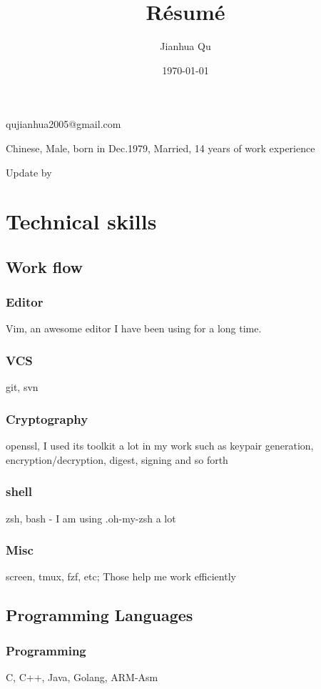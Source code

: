 \documentclass{article}
\makeatletter
\renewcommand{\maketitle}{
\begin{center}

{\huge\bfseries\theauthor}

\vspace{.25em}
qujianhua2005@gmail.com


\vspace{.25em}
Chinese, Male, born in Dec.1979, Married, 14 years of work experience

\vspace{.25em}
Update by \thedate

\end{center}
}
\makeatother
\begin{document}
\title {R\'esum\'e}
\author {Jianhua Qu}
\date{\today}

\maketitle

\section{Technical skills}

\subsection{Work flow}
\subsubsection{Editor}
Vim, an awesome editor I have been using for a long time.

\subsubsection{VCS}
git, svn

\subsubsection{Cryptography}
openssl, I used its toolkit a lot in my work such as keypair generation,
        encryption/decryption, digest, signing and so forth

\subsubsection{shell}
zsh, bash - I am using .oh-my-zsh a lot

\subsubsection{Misc}
screen, tmux, fzf, etc;
Those help me work efficiently

\subsection{Programming Languages}

\subsubsection{Programming}
C, C++, Java, Golang, ARM-Asm
\end{document}
